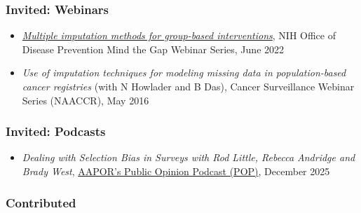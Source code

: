 \documentclass[
  english,
  letterpaper,
  DIV=11,
  numbers=noendperiod]{scrartcl}
\providecommand{\tightlist}{%
  \setlength{\itemsep}{0pt}\setlength{\parskip}{0pt}}
\begin{document}
\subsubsection{Invited: Webinars}\label{invited-webinars}

\begin{itemize}
\tightlist
\item
  \href{https://prevention.nih.gov/education-training/methods-mind-gap/multiple-imputation-methods-group-based-interventions}{\emph{Multiple
  imputation methods for group-based interventions}}, NIH Office of
  Disease Prevention Mind the Gap Webinar Series, June 2022
\item
  \emph{Use of imputation techniques for modeling missing data in
  population-based cancer registries} (with N Howlader and B Das),
  Cancer Surveillance Webinar Series (NAACCR), May 2016
\end{itemize}

\subsubsection{Invited: Podcasts}\label{invited-podcasts}

\begin{itemize}
\tightlist
\item
  \emph{Dealing with Selection Bias in Surveys with Rod Little, Rebecca
  Andridge and Brady West},
  \href{https://aapor.org/media/public-opinion-pod/}{AAPOR's Public
  Opinion Podcast (POP)}, December 2025
\end{itemize}

\subsubsection{Contributed}\label{contributed}
\end{document}
